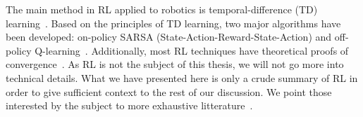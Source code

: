 






    The main method in RL applied to robotics is temporal-difference (TD) learning~\parencite{Sutton1988, Bradtke1996}. Based on the principles of TD learning, two major algorithms have been developed: on-policy SARSA (State-Action-Reward-State-Action) and off-policy Q-learning~\parencite{Watkins1989}. Additionally, most RL techniques have theoretical proofs of convergence~\parencite{Panait2005}. As RL is not the subject of this thesis, we will not go more into technical details. What we have presented here is only a crude summary of RL in order to give sufficient context to the rest of our discussion. We point those interested by the subject to more exhaustive litterature~\parencite{Sutton1998, Deisenroth2011}.



